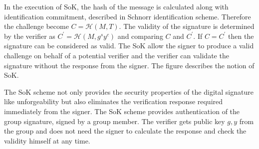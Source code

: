 In the execution of SoK, the hash of the message is calculated along with identification commitment, described in Schnorr identification scheme. Therefore the challenge become $C = \mathcal{H}(M, T)$. The validity of the signature is determined by the verifier as $C^\prime = \mathcal{H}(M, g^s y^c)$ and comparing $C$ and $C^\prime$. If $C = C^\prime$ then the signature can be considered as valid. The SoK allow the signer to produce a valid challenge on behalf of a potential verifier and the verifier can validate the signature without the response from the signer. The figure describes the notion of SoK.

The SoK scheme not only provides the security properties of the digital signature like unforgeability but also eliminates the verification response required immediately from the signer. The SoK scheme provides authentication of the group signature, signed by a group member. The verifier gets public key $g, y$ from the group and does not need the signer to calculate the response and check the validity himself at any time.

